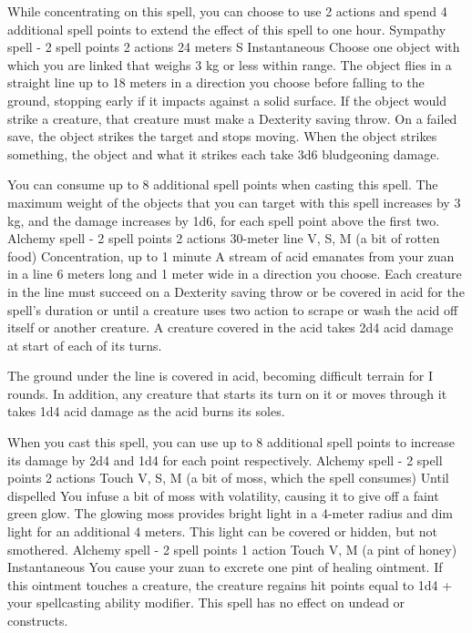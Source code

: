     While concentrating on this spell, you can choose to use 2 actions and spend 4 additional spell points to extend the effect of this spell to one hour.
    {Sympathy spell - 2 spell points}
    {2 actions}
    {24 meters}
    {S}
    {Instantaneous}
    Choose one object with which you are linked that weighs 3 kg or less within range.
    The object flies in a straight line up to 18 meters in a direction you choose before falling to the ground, stopping early if it impacts against a solid surface.
    If the object would strike a creature, that creature must make a Dexterity saving throw.
    On a failed save, the object strikes the target and stops moving.
    When the object strikes something, the object and what it strikes each take 3d6 bludgeoning damage.

    You can consume up to 8 additional spell points when casting this spell.
    The maximum weight of the objects that you can target with this spell increases by 3 kg, and the damage increases by 1d6, for each spell point above the first two.
    {Alchemy spell - 2 spell points}
    {2 actions}
    {30-meter line}
    {V, S, M (a bit of rotten food)}
    {Concentration, up to 1 minute}
    A stream of acid emanates from your zuan in a line 6 meters long and 1 meter wide in a direction you choose.
    Each creature in the line must succeed on a Dexterity saving throw or be covered in acid for the spell's duration or until a creature uses two action to scrape or wash the acid off itself or another creature.
    A creature covered in the acid takes 2d4 acid damage at start of each of its turns.

    The ground under the line is covered in acid, becoming difficult terrain for I rounds.
    In addition, any creature that starts its turn on it or moves through it takes 1d4 acid damage as the acid burns its soles.

    When you cast this spell, you can use up to 8 additional spell points to increase its damage by 2d4 and 1d4 for each point respectively.
    {Alchemy spell - 2 spell points}
    {2 actions}
    {Touch}
    {V, S, M (a bit of moss, which the spell consumes)}
    {Until dispelled}
    You infuse a bit of moss with volatility, causing it to give off a faint green glow.
    The glowing moss provides bright light in a 4-meter radius and dim light for an additional 4 meters.
    This light can be covered or hidden, but not smothered.
    {Alchemy spell - 2 spell points}
    {1 action}
    {Touch}
    {V, M (a pint of honey)}
    {Instantaneous}
    You cause your zuan to excrete one pint of healing ointment.
    If this ointment touches a creature, the creature regains hit points equal to 1d4 + your spellcasting ability modifier.
    This spell has no effect on undead or constructs.

